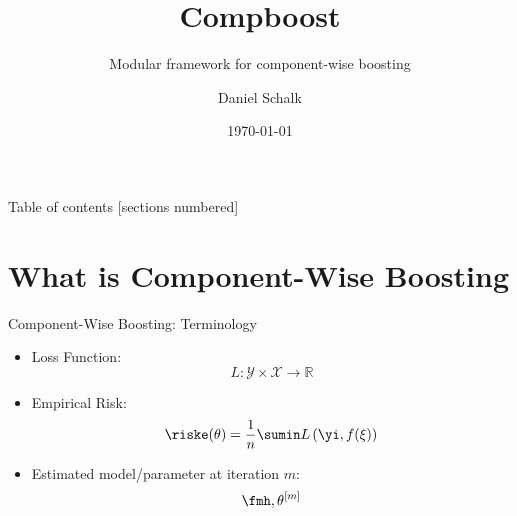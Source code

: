 \documentclass[10pt]{beamer}\usepackage[]{graphicx}\usepackage[]{color}
\title{Compboost}
\subtitle{Modular framework for component-wise boosting}
\date{\today}
\author{Daniel Schalk}
\institute{LMU Munich\\Working Group Computational Statistics}
\begin{document}
\maketitle

\begin{frame}[plain]{Table of contents}
	[sections numbered]
	\tableofcontents[hideallsubsections]
\end{frame}


\section{What is Component-Wise Boosting}


\begin{frame}[fragile]{Component-Wise Boosting: Terminology}


\begin{itemize}

  \item
    Loss Function: 
    \[
      L: \mathcal{Y} \times \mathcal{X} \rightarrow \mathbb{R}
    \]

  \item
    Empirical Risk:
    \[
      \riske(\theta) = \frac{1}{n} \sumin L\left(\yi, f(\xi)\right)
    \]

  \item 
    Estimated model/parameter at iteration $m$: 
    \[
      \fmh, \theta^{[m]}
    \]

\end{itemize}


\end{frame}
\end{document}
